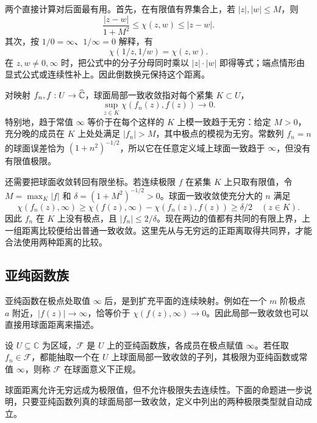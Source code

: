 \ProseParagraphBreak

两个直接计算对后面最有用。首先，在有限值有界集合上，若 \(|z|,|w|\le M\)，则
\[
 \frac{|z-w|}{1+M^2}\le\chi(z,w)\le |z-w|.
\]
其次，按 \(1/0=\infty\)、\(1/\infty=0\) 解释，有
\[
 \chi(1/z,1/w)=\chi(z,w).
\]
在 \(z,w\ne0,\infty\) 时，把公式中的分子分母同时乘以 \(|z|\cdot|w|\) 即得等式；端点情形由显式公式或连续性补上。因此倒数换元保持这个距离。

\ProseParagraphBreak

对映射 \(f_n,f:U\to\widehat{\mathbb C\kern0pt}\)，球面局部一致收敛指对每个紧集 \(K\subset U\)，
\[
 \sup_{z\in K}\chi(f_n(z),f(z))\longrightarrow0.
\]
特别地，趋于常值 \(\infty\) 等价于在每个这样的 \(K\) 上模一致趋于无穷：给定 \(M>0\)，充分晚的成员在 \(K\) 上处处满足 \(|f_n|>M\)，其中极点的模视为无穷。常数列 \(f_n=n\) 的球面误差恰为 \((1+n^2)^{-1/2}\)，所以它在任意定义域上球面一致趋于 \(\infty\)，但没有有限值极限。

\ProseParagraphBreak

还需要把球面收敛转回有限坐标。若连续极限 \(f\) 在紧集 \(K\) 上只取有限值，令 \(M=\max_K|f|\) 和 \(\delta=(1+M^2)^{-1/2}>0\)。球面一致收敛使充分大的 \(n\) 满足
\[
 \chi(f_n(z),\infty)
 \ge\chi(f(z),\infty)-\chi(f_n(z),f(z))
 \ge\delta/2\quad(z\in K).
\]
因此 \(f_n\) 在 \(K\) 上没有极点，且 \(|f_n|\le2/\delta\)。现在两边的值都有共同的有限上界，上一组距离比较便给出普通一致收敛。这里先从与无穷远的正距离取得共同界，才能合法使用两种距离的比较。

\subsection{亚纯函数族}
\label{b3:subsec:040204}

亚纯函数在极点处取值 \(\infty\) 后，是到扩充平面的连续映射。例如在一个 \(m\) 阶极点 \(a\) 附近，\(|f(z)|\to\infty\)，恰等价于 \(\chi(f(z),\infty)\to0\)。因此局部一致收敛也可以直接用球面距离来描述。

\begin{definition}\label{b3:def:04-meromorphic-normal}
设 \(U\subseteq\mathbb C\) 为区域，\(\mathcal F\) 是 \(U\) 上的亚纯函数族，各成员在极点赋值 \(\infty\)。若任取 \(f_n\in\mathcal F\)，都能抽取一个在 \(U\) 上球面局部一致收敛的子列，其极限为亚纯函数或常值 \(\infty\)，则称 \(\mathcal F\) 在球面意义下正规。
\end{definition}
球面距离允许无穷远成为极限值，但不允许极限失去连续性。下面的命题进一步说明，只要亚纯函数列真的球面局部一致收敛，定义中列出的两种极限类型就自动成立。

